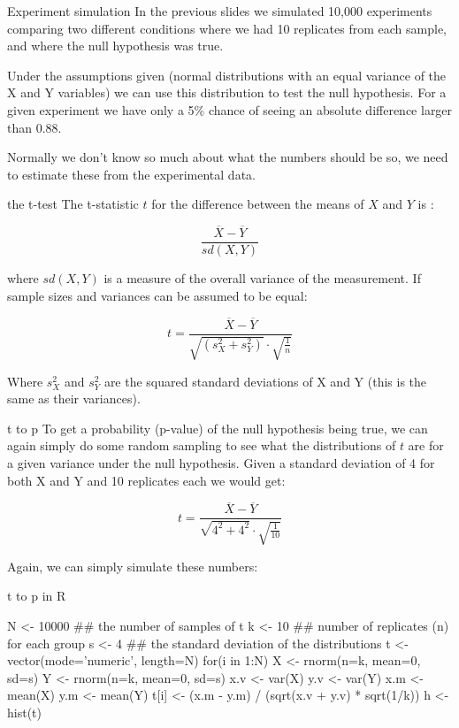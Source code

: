 \documentclass[pdf]{beamer}
\begin{document}
\begin{frame}{Experiment simulation}
  In the previous slides we simulated 10,000 experiments comparing two
  different conditions where we had 10 replicates from each sample, and where
  the null hypothesis was true.

  Under the assumptions given (normal distributions with an equal variance of the X and Y
  variables) we can use this distribution to test the null hypothesis. For
  a given experiment we have only a 5\% chance of seeing an absolute
  difference larger than 0.88.

  Normally we don't know so much about what the numbers should be so, we need
  to estimate these from the experimental data.
\end{frame}

\begin{frame}{the t-test}
  The t-statistic $t$ for the difference between the means of $X$ and $Y$
  is :

  $$
  \frac{\overline{X} - \overline{Y}}{sd(X,Y)}
  $$
  
  where $sd(X,Y)$ is a measure of the overall variance of the measurement. 
  If sample sizes and variances can be assumed to be equal:

  $$
  t = \frac{\overline{X} - \overline{Y}}{ \sqrt{(s^2_{X} +
      s^2_{Y})}\cdot\sqrt{\frac{1}{n}}}
  $$
  
  Where $s^2_X$ and $s^2_Y$ are the squared standard deviations of X and Y
  (this is the same as their variances).
  
\end{frame}

\begin{frame}{t to p}
  To get a probability (p-value) of the null hypothesis being true, we can again
  simply do some random sampling to see what the distributions of $t$ are for
  a given variance under the null hypothesis. Given a standard deviation of 4
  for both X and Y and 10 replicates each we would get:
  
  $$
  t = \frac{\overline{X} - \overline{Y}}{\sqrt{4^2 +
      4^2}\cdot\sqrt{\frac{1}{10}}}
  $$

  Again, we can simply simulate these numbers:

\end{frame}

\begin{frame}[fragile]{t to p in R}
  \begin{rcode}
    N <- 10000 ## the number of samples of t
    k <- 10    ## number of replicates (n) for each group
    s <- 4     ## the standard deviation of the distributions
    t <- vector(mode='numeric', length=N)
    for(i in 1:N){
      X <- rnorm(n=k, mean=0, sd=s)
      Y <- rnorm(n=k, mean=0, sd=s)
      x.v <- var(X)
      y.v <- var(Y)
      x.m <- mean(X)
      y.m <- mean(Y)
      t[i] <- (x.m - y.m) / (sqrt(x.v + y.v) * sqrt(1/k))
    }
    h <- hist(t)
  \end{rcode}
\end{frame}
\end{document}
